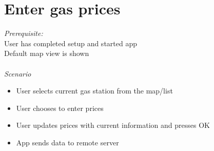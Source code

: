 \section{Enter gas prices}
\emph{Prerequisite:}\\
User has completed setup and started app\\
Default map view is shown \\
\\
\emph{Scenario}
\begin{itemize}
	\item User selects current gas station from the map/list
\item User chooses to enter prices
\item User updates prices with current information and presses OK
\item App sends data to remote server
\end{itemize}


